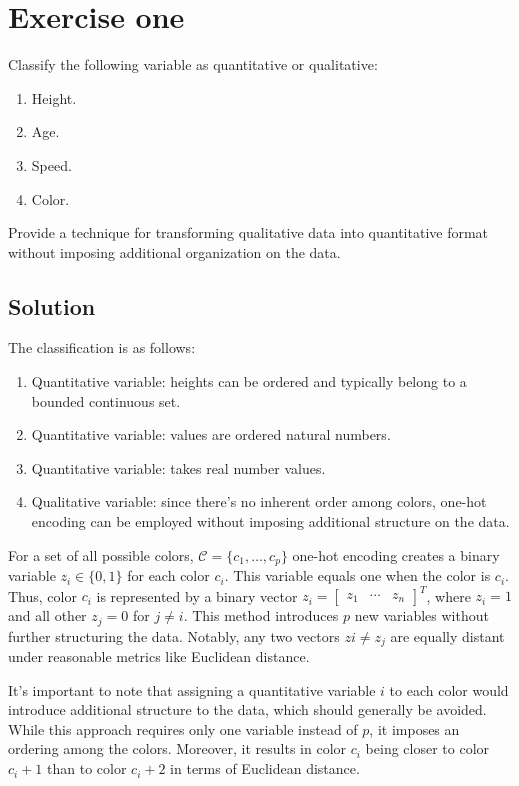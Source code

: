 \section{Exercise one}

Classify the following variable as quantitative or qualitative: 
\begin{enumerate}
    \item Height.
    \item Age.
    \item Speed.
    \item Color.
\end{enumerate}
Provide a technique for transforming qualitative data into quantitative format without imposing additional organization on the data.

\subsection*{Solution}
The classification is as follows:
\begin{enumerate}
    \item Quantitative variable: heights can be ordered and typically belong to a bounded continuous set.
    \item Quantitative variable: values are ordered natural numbers.
    \item Quantitative variable: takes real number values.
    \item Qualitative variable: since there's no inherent order among colors, one-hot encoding can be employed without imposing additional structure on the data.
\end{enumerate}
For a set of all possible colors, $\mathcal{C} = \{c_1, \dots , c_p\}$ one-hot encoding creates a binary variable  $z_i \in \{0, 1\}$ for each color $c_i$. 
This variable equals one when the color is $c_i$. 
Thus, color $c_i$ is represented by a binary vector $z_i = \begin{bmatrix} z_1 & \cdots & z_n \end{bmatrix}^T$, where $z_i = 1$ and all other $z_j = 0$ for $j \neq i$.
This method introduces $p$ new variables without further structuring the data.
Notably, any two vectors $zi \neq z_j$ are equally distant under reasonable metrics like Euclidean distance.

It's important to note that assigning a quantitative variable $i$ to each color would introduce additional structure to the data, which should generally be avoided.
While this approach requires only one variable instead of $p$, it imposes an ordering among the colors.
Moreover, it results in color $c_i$ being closer to color $c_i+1$ than to color $c_i+2$ in terms of Euclidean distance.